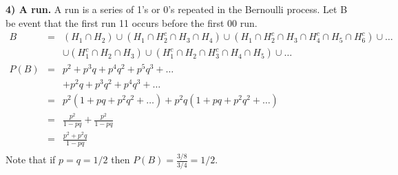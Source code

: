{\bf 4) A run.}  
A run is a series of 1's or 0's repeated in the Bernoulli process.
Let B be event that the first run 11 occurs before the first 00 run.
\begin{eqnarray*}
B &=& (H_1 \cap H_2) \cup (H_1 \cap H_2^c \cap H_3 \cap H_4) \cup 
(H_1 \cap H_2^c \cap H_3 \cap H_4^c \cap H_5 \cap H_6^c) \cup \ldots \\
& &\cup (H_1^c \cap H_2 \cap H_3) \cup 
(H_1^c \cap H_2 \cap H_3^c \cap H_4 \cap H_5) \cup \ldots \\
P(B) &=& p^2 + p^3 q + p^4 q^2 + p^5 q^3 + \ldots \\
& & + p^2 q + p^3 q^2 + p^4 q^3+ \ldots \\
&=& p^2(1+pq+p^2 q^2+\ldots) + p^2 q (1+ pq+ p^2 q^2 + \ldots)\\
&=& \frac{p^2}{1-pq} + \frac{p^2}{1-pq}\\ 
&=& \frac{p^2 + p^2 q}{1-pq}\\
\end{eqnarray*}
Note that if $p=q=1/2$ then $P(B)= \frac{3/8}{3/4} = 1/2$.

